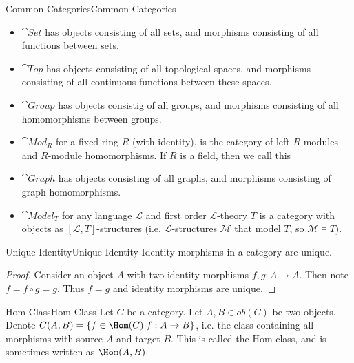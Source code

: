 \documentclass[12pt]{article}
\begin{document}
\begin{example}{Common Categories}{Common Categories}
	\begin{itemize}
		\item
		 
		$\cat{Set}$ has objects consisting of all sets, and morphisms consisting of all functions between sets.
		\item
		 
		$\cat{Top}$ has objects consisting of all topological spaces, and morphisms consisting of all continuous functions between these spaces.
		\item
		 
		$\cat{Group}$ has objects consistig of all groups, and morphisms consisting of all homomorphisms between groups.
		\item
		 
		$\cat{Mod}_R$ for a fixed ring $R$ (with identity),  is the category of left $R$-modules and $R$-module homomorphisms.
		If $R$ is a field, then we call this   
		\item
		 
		$\cat{Graph}$ has objects consisting of all graphs, and morphisms consisting of graph homomorphisms.
		\item
		 
		$\cat{Model}_T$ for any language $\mathcal L$ and first order $\mathcal L$-theory $T$ is a category with objects as 
		$[\mathcal L, T]$-structures (i.e. $\mathcal L$-structures $\mathcal M$ that model $T$, so $\mathcal M \models T$).
	\end{itemize}
\end{example}

\begin{result}{Unique Identity}{Unique Identity}
	Identity morphisms in a category are unique.
	\dline
	\begin{proof}
		Consider an object $A$ with two identity morphisms $f, g : A \to A$. Then note $f = f \circ g = g$. 
		Thus $f = g$ and identity morphisms are unique.
	\end{proof}
\end{result}
\begin{definition}{Hom Class}{Hom Class}
	Let $C$ be a category. Let $A,B \in ob(C)$ be two objects. Denote $C(A,B) = \{ f \in \Hom(C)  |  f : A \to B\}$, 
	i.e. the class containing all morphisms with source $A$ and target $B$. This is called the Hom-class, and is sometimes written as $\Hom(A,B)$.
\end{definition}
\end{document}
